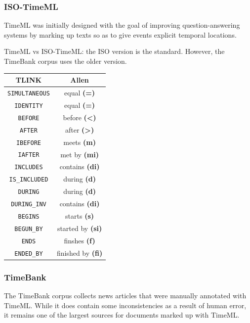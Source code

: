 \documentclass[a4paper,12pt,leqno]{article}
\begin{document}
\subsubsection{ISO-TimeML}\label{ssub:timeml}
TimeML \citep{Pustejovsky2005} was initially designed with the goal of improving question-answering systems by marking up texts so as to give events explicit temporal locations.

TimeML vs ISO-TimeML: the ISO version is the standard. However, the TimeBank corpus uses the older version.

\begin{center}
	\begin{tabular}{|c c|}
		\hline
		\textbf{TLINK} & \textbf{Allen}\\
		\hline
		\texttt{SIMULTANEOUS} & equal \textbf{(=)}\\
		\texttt{IDENTITY} & equal \textbf{(=)}\\
		\texttt{BEFORE} & before \textbf{(\textless{})}\\
		\texttt{AFTER} & after \textbf{(\textgreater{})}\\
		\texttt{IBEFORE} & meets \textbf{(m)}\\
		\texttt{IAFTER} & met by \textbf{(mi)}\\
		\texttt{INCLUDES} & contains \textbf{(di)}\\
		\texttt{IS\_INCLUDED} & during \textbf{(d)}\\
		\texttt{DURING} & during \textbf{(d)}\\
		\texttt{DURING\_INV} & contains \textbf{(di)}\\
		\texttt{BEGINS} & starts \textbf{(s)}\\
		\texttt{BEGUN\_BY} & started by \textbf{(si)}\\
		\texttt{ENDS} & finshes \textbf{(f)}\\
		\texttt{ENDED\_BY} & finished by \textbf{(fi)}\\
		\hline
	\end{tabular}
	\label{fig:tlink-allen-translation}
\end{center}

\subsubsection{TimeBank}\label{ssub:timebank}
The TimeBank corpus \citep{pustejovsky2006timebank} collects news articles that were manually annotated with TimeML. While it does contain some inconsistencies as a result of human error, it remains one of the largest sources for documents marked up with TimeML.
\end{document}
